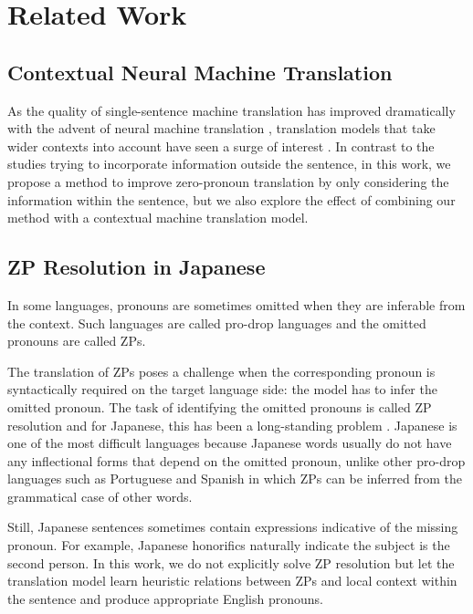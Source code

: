 \section{Related Work}
\subsection{Contextual Neural Machine Translation}
As the quality of single-sentence machine translation has improved dramatically with the advent of neural machine translation \citep{NIPS2014_a14ac55a,NIPS2017_3f5ee243}, translation models that take wider contexts into account have seen a surge of interest \citep{Jean2017DoesNM,bawden-etal-2018-evaluating,voita-etal-2019-good,voita-etal-2019-context,ma-etal-2020-simple,saunders-etal-2020-using}.
In contrast to the studies trying to incorporate information outside the sentence, in this work, we propose a method to improve zero-pronoun translation by only considering the information within the sentence, but we also explore the effect of combining our method with a contextual machine translation model.

\subsection{ZP Resolution in Japanese}
In some languages, pronouns are sometimes omitted when they are inferable from the context. Such languages are called pro-drop languages and the omitted pronouns are called ZPs.

The translation of ZPs poses a challenge when the corresponding pronoun is syntactically required on the target language side: the model has to infer the omitted pronoun.
The task of identifying the omitted pronouns is called ZP resolution and for Japanese, this has been a long-standing problem \citep{isozaki-hirao-2003-japanese,sasano-etal-2008-fully,imamura-etal-2009-discriminative,shibata-kurohashi-2018-entity}.
Japanese is one of the most difficult languages because Japanese words usually do not have any inflectional forms that depend on the omitted pronoun, unlike other pro-drop languages such as Portuguese and Spanish in which ZPs can be inferred from the grammatical case of other words.

Still, Japanese sentences sometimes contain expressions indicative of the missing pronoun. For example,  Japanese honorifics naturally indicate the subject is the second person.
In this work, we do not explicitly solve ZP resolution but let the translation model learn heuristic relations between ZPs and local context within the sentence \citep{hangyo-etal-2013-japanese,kudo-etal-2015-anlp} and produce appropriate English pronouns.


